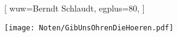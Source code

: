 [
    wuw={Berndt Schlaudt}, 
    egplus={80},
]

\beginverse
\endverse
\texttt{[image: Noten/GibUnsOhrenDieHoeren.pdf]}	

\endsong

